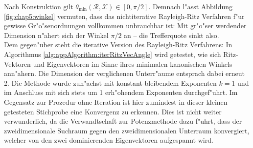 Nach Konstruktion gilt $\theta_{\min}(\mathcal{R},\mathcal{X})\in[0,\pi/2]$.
Demnach l"asst Abbildung \ref{fig:chap5:winkel} vermuten, dass das nichtiterative Rayleigh-Ritz Verfahren f"ur gewisse Gr"o"senordnungen vollkommen unbrauchbar ist: Mit gr"o"ser werdender Dimension n"ahert sich der Winkel $\pi/2$ an -- die Trefferquote sinkt also.\\

Dem gegen"uber steht die iterative Version des Rayleigh-Ritz Verfahrens: In Algorithmus \ref{alg:appAlgorithm:iterRitzVecAngle} wird getestet, wie sich Ritz-Vektoren und Eigenvektoren im Sinne ihres minimalen kanonischen Winkels ann"ahern. Die Dimension der verglichenen Unterr"aume entsprach dabei erneut 2.
Die Methode wurde zun"achst mit konstant bleibendem Exponenten $k=1$ und im Anschluss mit sich stets um 1 erh"ohendem Exponenten durchgef"uhrt. Im Gegensatz zur Prozedur ohne Iteration ist hier zumindest in dieser kleinen getesteten Stichprobe eine Konvergenz zu erkennen. Dies ist nicht weiter verwunderlich, da die Verwandtschaft zur Potenzmethode dazu f"uhrt, dass der zweidimensionale Suchraum gegen den zweidimensionalen Unterraum konvergiert, welcher von den zwei dominierenden Eigenvektoren aufgespannt wird.


